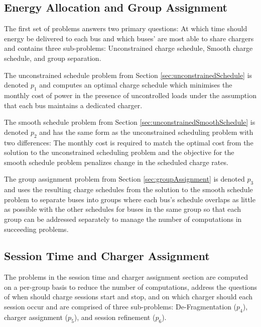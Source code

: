 \subsection{Energy Allocation and Group Assignment} 
\par The first set of problems answers two primary questions: At which time should energy be delivered to each bus and which buses' are most able to share chargers and contains three sub-problems: Unconstrained charge schedule, Smooth charge schedule, and group separation.  
\par The unconstrained schedule problem from Section \ref{sec:unconstrainedSchedule} is denoted $p_1$ and computes an optimal charge schedule which minimises the monthly cost of power in the presence of uncontrolled loads under the assumption that each bus maintains a dedicated charger.  
\par The smooth schedule problem from Section \ref{sec:unconstrainedSmoothSchedule} is denoted $p_2$ and has the same form as the unconstrained scheduling problem with two differences: The monthly cost is required to match the optimal cost from the solution to the unconstrained scheduling problem and the objective for the smooth schedule problem penalizes change in the scheduled charge rates.  
\par The group assignment problem from Section \ref{sec:groupAssignment} is denoted $p_3$ and uses the resulting charge schedules from the solution to the smooth schedule problem to separate buses into groups where each bus's schedule overlaps as little as possible with the other schedules for buses in the same group so that each group can be addressed separately to manage the number of computations in succeeding problems.  

\subsection{Session Time and Charger Assignment} 
The problems in the session time and charger assignment section are computed on a per-group basis to reduce the number of computations, address the questions of when should charge sessions start and stop, and on which charger should each session occur and are comprised of three sub-problems: De-Fragmentation ($p_4$), charger assignment ($p_5$), and session refinement ($p_6$).

